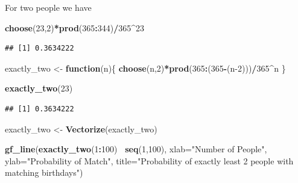 \documentclass[
]{book}
\newenvironment{Shaded}{\begin{snugshade}}{\end{snugshade}}
\newcommand{\ControlFlowTok}[1]{\textcolor[rgb]{0.13,0.29,0.53}{\textbf{#1}}}
\newcommand{\DataTypeTok}[1]{\textcolor[rgb]{0.13,0.29,0.53}{#1}}
\newcommand{\DecValTok}[1]{\textcolor[rgb]{0.00,0.00,0.81}{#1}}
\newcommand{\KeywordTok}[1]{\textcolor[rgb]{0.13,0.29,0.53}{\textbf{#1}}}
\newcommand{\NormalTok}[1]{#1}
\newcommand{\OperatorTok}[1]{\textcolor[rgb]{0.81,0.36,0.00}{\textbf{#1}}}
\newcommand{\StringTok}[1]{\textcolor[rgb]{0.31,0.60,0.02}{#1}}
\begin{document}
For two people we have

\begin{Shaded}
\begin{Highlighting}[]
\KeywordTok{choose}\NormalTok{(}\DecValTok{23}\NormalTok{,}\DecValTok{2}\NormalTok{)}\OperatorTok{*}\KeywordTok{prod}\NormalTok{(}\DecValTok{365}\OperatorTok{:}\DecValTok{344}\NormalTok{)}\OperatorTok{/}\DecValTok{365}\OperatorTok{^}\DecValTok{23}
\end{Highlighting}
\end{Shaded}

\begin{verbatim}
## [1] 0.3634222
\end{verbatim}

\begin{Shaded}
\begin{Highlighting}[]
\NormalTok{exactly_two <-}\StringTok{ }\ControlFlowTok{function}\NormalTok{(n)\{}
  \KeywordTok{choose}\NormalTok{(n,}\DecValTok{2}\NormalTok{)}\OperatorTok{*}\KeywordTok{prod}\NormalTok{(}\DecValTok{365}\OperatorTok{:}\NormalTok{(}\DecValTok{365}\OperatorTok{-}\NormalTok{(n}\DecValTok{-2}\NormalTok{)))}\OperatorTok{/}\DecValTok{365}\OperatorTok{^}\NormalTok{n}
\NormalTok{\}}
\end{Highlighting}
\end{Shaded}

\begin{Shaded}
\begin{Highlighting}[]
\KeywordTok{exactly_two}\NormalTok{(}\DecValTok{23}\NormalTok{)}
\end{Highlighting}
\end{Shaded}

\begin{verbatim}
## [1] 0.3634222
\end{verbatim}

\begin{Shaded}
\begin{Highlighting}[]
\NormalTok{exactly_two <-}\StringTok{ }\KeywordTok{Vectorize}\NormalTok{(exactly_two)}
\end{Highlighting}
\end{Shaded}

\begin{Shaded}
\begin{Highlighting}[]
\KeywordTok{gf_line}\NormalTok{(}\KeywordTok{exactly_two}\NormalTok{(}\DecValTok{1}\OperatorTok{:}\DecValTok{100}\NormalTok{)}\OperatorTok{~}\StringTok{ }\KeywordTok{seq}\NormalTok{(}\DecValTok{1}\NormalTok{,}\DecValTok{100}\NormalTok{),}
        \DataTypeTok{xlab=}\StringTok{"Number of People"}\NormalTok{,}
        \DataTypeTok{ylab=}\StringTok{"Probability of Match"}\NormalTok{,}
        \DataTypeTok{title=}\StringTok{"Probability of exactly least 2 people with matching birthdays"}\NormalTok{)}
\end{Highlighting}
\end{Shaded}
\end{document}
